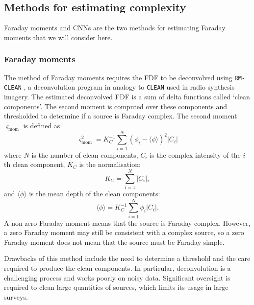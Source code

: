    \subsection{Methods for estimating complexity}
    \label{sec:faraday-existing-methods}

        Faraday moments \citep{Brown11report,anderson_broadband_2015} and CNNs \citep{brown_classifying_2018} are the two methods for estimating Faraday moments that we will consider here.

        \subsubsection{Faraday moments}
        \label{sec:faraday-faraday-moments}
            The method of Faraday moments requires the FDF to be deconvolved using \texttt{RM-CLEAN} \citep{heald09faraday}, a deconvolution program in analogy to \texttt{CLEAN} used in radio synthesis imagery. The estimated deconvolved FDF is a sum of delta functions called `clean components'. The second moment is computed over these components and thresholded to determine if a source is Faraday complex. The second moment $\varsigma_{\mathrm{mom}}$ is defined as
            \begin{equation}
                \varsigma_{\mathrm{mom}}^2 = K_C^{-1} \sum_{i = 1}^N (\phi_i - \langle \phi \rangle)^2 |C_i|
            \end{equation}
            where $N$ is the number of clean components, $C_i$ is the complex intensity of the $i$th clean component, $K_C$ is the normalisation:
            \begin{equation}
                K_C = \sum_{i = 1}^N |C_i|,
            \end{equation}
            and $\langle \phi \rangle$ is the mean depth of the clean components:
            \begin{equation}
                \langle \phi \rangle = K_C^{-1} \sum_{i = 1}^N \phi_i |C_i|.
            \end{equation}
            A non-zero Faraday moment means that the source is Faraday complex. However, a zero Faraday moment may still be consistent with a complex source, so a zero Faraday moment does not mean that the source must be Faraday simple.

            Drawbacks of this method include the need to determine a threshold and the care required to produce the clean components. In particular, deconvolution is a challenging process and works poorly on noisy data. Significant oversight is required to clean large quantities of sources, which limits its usage in large surveys.


